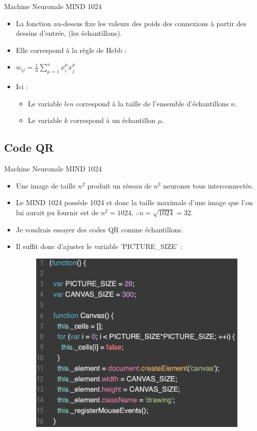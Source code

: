 \documentclass{beamer}
\begin{document}
\begin{frame}{Machine Neuronale MIND 1024}
    \begin{itemize}[<+-| alert@+>] %
        \item La fonction au-dessus fixe les valeurs des poids des connexions à partir des dessins d'entrée, (les échantillons).
        \item Elle correspond à la règle de Hebb :
        \item $w_{ij} = \frac{1}{n}\sum_{\mu=1}^{n}x_{i}^{\mu}x_{j}^{\mu}$
        \item Ici :
            \begin{itemize}[<+-| alert@+>] %
                \item Le variable $len$ correspond à la taille de l'ensemble d'échantillons $n$.
                \item Le variable $k$ correspond à un échantillon $\mu$.
            \end{itemize}
    \end{itemize}
\end{frame}

\subsection{Code QR}

\begin{frame}{Machine Neuronale MIND 1024}
    \begin{itemize}[<+-| alert@+>] %
        \item Une image de taille $n^2$ produit un réseau de $n^2$ neurones tous interconnectés.
        \item Le MIND 1024 possède 1024 et donc la taille maximale d'une image que l'on lui aurait pu fournir est de $n^2 = 1024$, $\therefore n = \sqrt{1024} = 32$.
        \item Je voudrais essayer des codes QR comme échantillons.
        \item Il suffit donc d'ajuster le variable 'PICTURE\_SIZE' :
        \begin{figure}
            \centering
            \includegraphics[width=0.38\linewidth]{pic/alg3.png}
        \end{figure}
    \end{itemize}
\end{frame}
\end{document}
